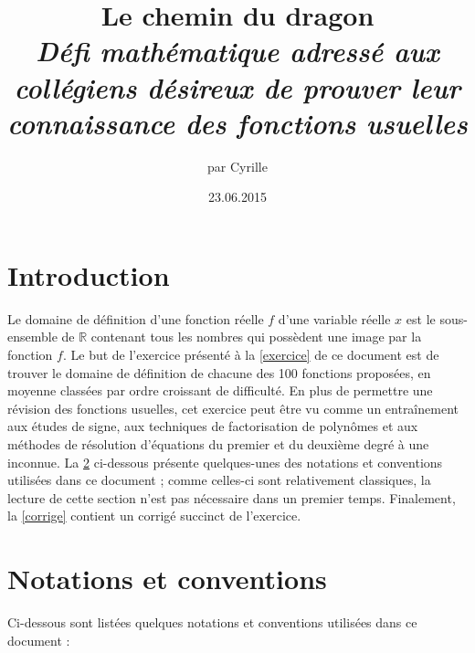 \documentclass[a4paper,12pt]{article}
\begin{document}
\title{
Le chemin du dragon\\
\vspace{0.25cm} \Large \textit{D\'efi math\'ematique adress\' e aux coll\'egiens d\' esireux de prouver leur connaissance des fonctions usuelles}}
\author{par Cyrille }
\date{23.06.2015}
\maketitle
\section{Introduction}
 Le domaine de d\'efinition d'une fonction  r\'eelle   $f$ d'une variable r\'eelle $x$ est le sous-ensemble de $\mathbb{R}$ contenant tous les nombres qui poss\`edent une image par la fonction $f$.
Le but de l'exercice pr\'esent\'e \`a la \cref{exercice} de ce document est  de trouver le domaine de d\'efinition de chacune des 100 fonctions propos\'ees, en moyenne class\'ees par ordre croissant de difficult\'e.
En plus de permettre une r\'evision des fonctions usuelles, cet exercice peut \^etre vu comme un entra\^inement aux \'etudes de signe, aux techniques de factorisation de polyn\^omes et aux m\'ethodes de r\'esolution d'\'equations du premier et du deuxi\`eme degr\'e \`a une inconnue.
La \cref{notations} ci-dessous pr\'esente quelques-unes des notations et conventions utilis\'ees dans ce document ; comme celles-ci sont relativement classiques, la lecture de cette section n'est pas n\'ecessaire dans un premier temps.
Finalement, la \cref{corrige} contient un corrig\'e succinct de l'exercice.
\clearpage
\section{Notations et conventions}\label{notations}
Ci-dessous sont list\'ees quelques notations et conventions utilis\'ees dans ce document :
\end{document}
